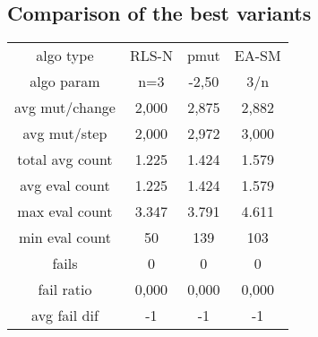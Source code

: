 \subsection{Comparison of the best variants}

\begin{tabular}[h]{cccc}
algo type&            RLS-N&      pmut&     EA-SM\\
algo param&             n=3&     -2,50&       3/n\\
avg mut/change&       2,000&     2,875&     2,882\\
avg mut/step&         2,000&     2,972&     3,000\\
\hline
total avg count&      1.225&     1.424&     1.579\\
avg eval count&       1.225&     1.424&     1.579\\
max eval count&       3.347&     3.791&     4.611\\
min eval count&          50&       139&       103\\
\hline
fails&                    0&         0&         0\\
fail ratio&           0,000&     0,000&     0,000\\
avg fail dif&            -1&        -1&        -1\\
\end{tabular}
